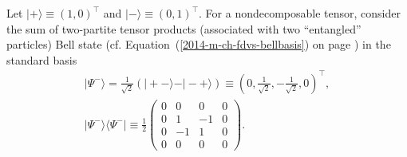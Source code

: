 {
\color{blue}
\bexample
Let
$\vert + \rangle  \equiv   (1,0)^\intercal$
and
$\vert - \rangle  \equiv   (0,1)^\intercal$.
For a nondecomposable tensor, consider the sum of two-partite tensor products (associated with two ``entangled'' particles)
Bell state (cf. Equation~(\ref{2014-m-ch-fdvs-bellbasis}) on page \pageref{2014-m-ch-fdvs-bellbasis}) in the standard basis     
\begin{equation}
\begin{split}
\vert \Psi^-\rangle = \frac{1}{\sqrt{2}}\left(\vert +-\rangle   - \vert -+\rangle  \right)
 \equiv  \left( 0,\frac{1}{\sqrt{2}},- \frac{1}{\sqrt{2}} ,  0 \right)^\intercal , \\
\vert \Psi^-\rangle \langle  \Psi^- \vert \equiv  \frac{1}{2}
\begin{pmatrix}
0&0&0&0\\
0&1&-1&0\\
0&-1&1&0\\
0&0&0&0
\end{pmatrix}
.
\end{split}
\label{2011-m-bellstatenondec}
\end{equation}

}

